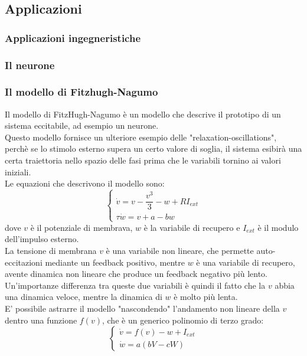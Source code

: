 \documentclass[12pt]{article}
\begin{document}
\subsection{Applicazioni}
\subsubsection{Applicazioni ingegneristiche }
\subsubsection{Il neurone}
\subsubsection{Il modello di Fitzhugh-Nagumo }
Il modello di FitzHugh-Nagumo è un modello che descrive il prototipo di un sistema eccitabile, ad esempio un neurone. \\
Questo modello fornisce un ulteriore esempio delle "relaxation-oscillations", perchè se lo stimolo esterno supera un certo valore di soglia, il sistema esibirà una certa traiettoria nello spazio delle fasi prima che le variabili tornino ai valori iniziali. \\
Le equazioni che descrivono il modello sono:
\begin{equation}
	\begin{cases}
		\dot{v} = v - \dfrac{v^3}{3} - w + RI_{ext} \\
		\tau \dot{w} = v + a - bw
	\end{cases}
\end{equation}
dove $v$ è il potenziale di membrava, $w$ è la variabile di recupero e $I_{ext}$ è il modulo dell'impulso esterno. \\
La tensione di membrana $v$ è una variabile non lineare, che permette auto-eccitazioni mediante un feedback positivo, mentre $w$ è una variabile di recupero, avente dinamica non lineare che produce un feedback negativo più lento. \\
Un'importanze differenza tra queste due variabili è quindi il fatto che la $v$ abbia una dinamica veloce, mentre la dinamica di $w$ è molto più lenta. \\
E' possibile astrarre il modello "nascondendo" l'andamento non lineare della $v$ dentro una funzione $f(v)$, che è un generico polinomio di terzo grado:
\begin{equation}
	\begin{cases}
		\dot{v} = f(v) - w + I_{ext} \\
		\dot{w} = a(bV - cW)
	\end{cases}
\end{equation} 
\end{document}
